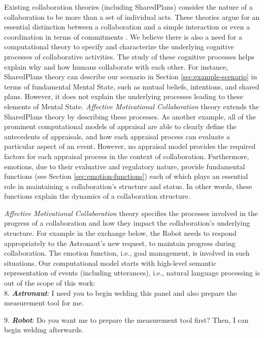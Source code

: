 \documentclass[12pt]{report}
\begin{document}
Existing collaboration theories (including SharedPlans) consider the nature of a
collaboration to be more than a set of individual acts. These theories argue for
an essential distinction between a collaboration and a simple interaction or
even a coordination in terms of commitments \cite{grosz:shared-plans,
lochbaum:collaborative-planning}. We believe there is also a need for a
computational theory to specify and characterize the underlying cognitive
processes of collaborative activities. The study of these cognitive processes
helps explain why and how humans collaborate with each other. For instance,
SharedPlans theory can describe our scenario in Section
\ref{sec:example-scenario} in terms of fundamental Mental State, such as mutual
beliefs, intentions, and shared plans. However, it does not explain the
underlying processes leading to these elements of Mental State.
\textit{Affective Motivational Collaboration} theory extends the SharedPlans
theory by describing these processes. As another example, all of the
prominent computational models of appraisal are able to clearly define the
antecedents of appraisals, and how each appraisal process can evaluate a
particular aspect of an event. However, no appraisal model provides the required
factors for each appraisal process in the context of collaboration.
Furthermore, emotions, due to their evaluative and regulatory nature, provide
fundamental functions (see Section \ref{sec:emotion-functions}) each of which
plays an essential role in maintaining a collaboration's structure and status.
In other words, these functions explain the dynamics of a collaboration
structure.

\textit{Affective Motivational Collaboration} theory specifies the processes
involved in the progress of a collaboration and how they impact the
collaboration's underlying structure. For example in the exchange below, the
Robot needs to respond appropriately to the Astronaut's new request, to maintain
progress during collaboration. The emotion function, i.e., goal management, is
involved in such situations. Our computational model starts with
high-level semantic representation of events (including utterances), i.e.,
natural language processing is out of the scope of this work:\\

  8. \textbf{\textit{Astronaut}}: I need you to begin welding this panel and also
  prepare the measurement tool for me.

  9. \textbf{\textit{Robot}}: Do you want me to prepare the measurement tool
  first? Then, I can begin welding afterwards.\\
\end{document}
